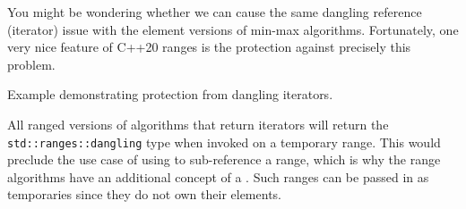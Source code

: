 You might be wondering whether we can cause the same dangling reference (iterator) issue with the element versions of min-max algorithms. Fortunately, one very nice feature of C++20 ranges is the protection against precisely this problem.

\begin{codebox}[]{\href{https://compiler-explorer.com/z/vq7d3bq1K}{\ExternalLink}}
\footnotesize Example demonstrating protection from dangling iterators.
\tcblower
{}
\end{codebox}

All ranged versions of algorithms that return iterators will return the \texttt{std::ranges\-::dangling} type when invoked on a temporary range. This would preclude the use case of using  to sub-reference a range, which is why the range algorithms have an additional concept of a . Such ranges can be passed in as temporaries since they do not own their elements.